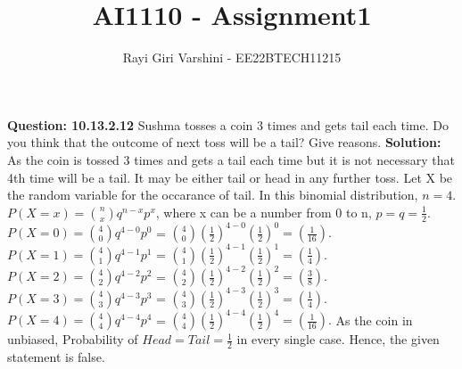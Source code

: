 \documentclass[journal,12pt,twocolumn]{IEEEtran}
\begin{document}
\title{AI1110 - Assignment1}
\author{Rayi Giri Varshini - EE22BTECH11215}	
\maketitle
\textbf{Question: 10.13.2.12}
Sushma tosses a coin 3 times and gets tail each time. Do you think that the outcome of next toss will be a tail? Give reasons.
\textbf{Solution:}
As the coin is tossed 3 times and gets a tail each time but it is not necessary that 4th time will be a tail. It may be either tail or head in any
further toss. 
Let X be the random variable for the occarance of tail.
In this binomial distribution, $n = 4$.
 $P(X = x) = \binom{n}{x} q^{n-x} p^x$, where x can be a number from 0 to n, $p = q = \frac{1}{2}.$                                          
 $P(X = 0) = \binom{4}{0} q^{4-0} p^0$ = $\binom{4}{0} (\frac{1}{2})^{4-0} (\frac{1}{2})^0 = (\frac{1}{16}).$
 $P(X = 1) = \binom{4}{1} q^{4-1} p^1$ = $\binom{4}{1} (\frac{1}{2})^{4-1} (\frac{1}{2})^1 = (\frac{1}{4}).$
 $P(X = 2) = \binom{4}{2} q^{4-2} p^2$ = $\binom{4}{2} (\frac{1}{2})^{4-2} (\frac{1}{2})^2= (\frac{3}{8}).$
 $P(X = 3) = \binom{4}{3} q^{4-3} p^3$ = $\binom{4}{3} (\frac{1}{2})^{4-3} (\frac{1}{2})^3 = (\frac{1}{4}).$
 $P(X = 4) = \binom{4}{4} q^{4-4} p^4$ = $\binom{4}{4} (\frac{1}{2})^{4-4} (\frac{1}{2})^4 = (\frac{1}{16}).$
As the coin in unbiased,
Probability of $Head = Tail = \frac{1}{2} $ in every single case.
Hence, the given statement is false.
\end{document}
